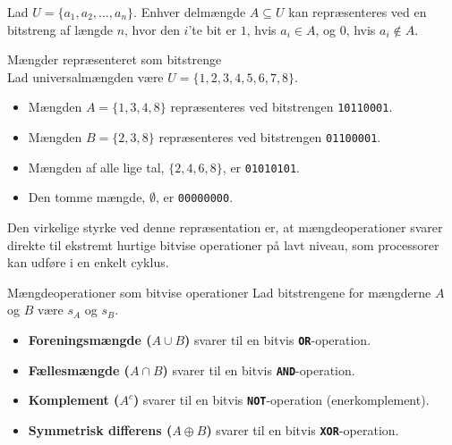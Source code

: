 Lad $U = \{a_1, a_2, \dots, a_n\}$. Enhver delmængde $A \subseteq U$ kan repræsenteres ved en bitstreng af længde $n$, hvor den $i$'te bit er $1$, hvis $a_i \in A$, og $0$, hvis $a_i \notin A$.

\begin{example}{Mængder repræsenteret som bitstrenge}\\
    Lad universalmængden være $U = \{1, 2, 3, 4, 5, 6, 7, 8\}$.
    \begin{itemize}
        \item Mængden $A = \{1, 3, 4, 8\}$ repræsenteres ved bitstrengen \texttt{10110001}.
        \item Mængden $B = \{2, 3, 8\}$ repræsenteres ved bitstrengen \texttt{01100001}.
        \item Mængden af alle lige tal, $\{2, 4, 6, 8\}$, er \texttt{01010101}.
        \item Den tomme mængde, $\emptyset$, er \texttt{00000000}.
    \end{itemize}
\end{example}

Den virkelige styrke ved denne repræsentation er, at mængdeoperationer svarer direkte til ekstremt hurtige bitvise operationer på lavt niveau, som processorer kan udføre i en enkelt cyklus.

\begin{custombox}{Mængdeoperationer som bitvise operationer}
    Lad bitstrengene for mængderne $A$ og $B$ være $s_A$ og $s_B$.
    \begin{itemize}
        \item \textbf{Foreningsmængde ($A \cup B$)} svarer til en bitvis \textbf{\texttt{OR}}-operation.
        \item \textbf{Fællesmængde ($A \cap B$)} svarer til en bitvis \textbf{\texttt{AND}}-operation.
        \item \textbf{Komplement ($A^c$)} svarer til en bitvis \textbf{\texttt{NOT}}-operation (enerkomplement).
        \item \textbf{Symmetrisk differens ($A \oplus B$)} svarer til en bitvis \textbf{\texttt{XOR}}-operation.
    \end{itemize}
\end{custombox}

